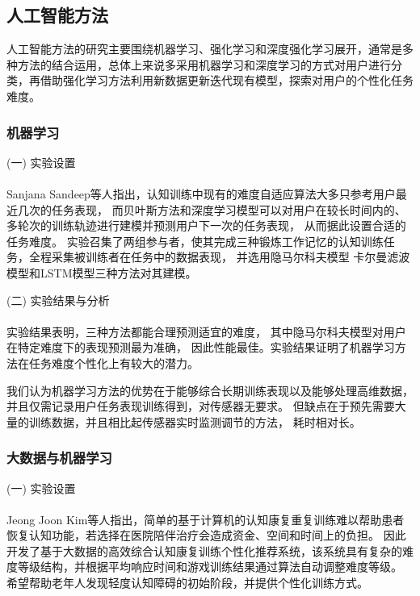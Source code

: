 \documentclass{article}
\begin{document}
            
        \subsection{人工智能方法}
        人工智能方法的研究主要围绕机器学习、强化学习和深度强化学习展开，通常是多种方法的结合运用，总体上来说多采用机器学习和深度学习的方式对用户进行分类，再借助强化学习方法利用新数据更新迭代现有模型，探索对用户的个性化任务难度。
            \subsubsection{机器学习}
            (一) 实验设置\paragraph{}
            Sanjana Sandeep等人指出，认知训练中现有的难度自适应算法大多只参考用户最近几次的任务表现，
            而贝叶斯方法和深度学习模型可以对用户在较长时间内的、多轮次的训练轨迹进行建模并预测用户下一次的任务表现，
            从而据此设置合适的任务难度。
            实验召集了两组参与者，使其完成三种锻炼工作记忆的认知训练任务，全程采集被训练者在任务中的数据表现，
            并选用隐马尔科夫模型 卡尔曼滤波模型和LSTM模型三种方法对其建模。

            (二) 实验结果与分析\paragraph{}
            实验结果表明，三种方法都能合理预测适宜的难度，
            其中隐马尔科夫模型对用户在特定难度下的表现预测最为准确，
            因此性能最佳。实验结果证明了机器学习方法在任务难度个性化上有较大的潜力。

            我们认为机器学习方法的优势在于能够综合长期训练表现以及能够处理高维数据，
            并且仅需记录用户任务表现训练得到，对传感器无要求。
            但缺点在于预先需要大量的训练数据，并且相比起传感器实时监测调节的方法，
            耗时相对长。

            \subsubsection{大数据与机器学习}
            (一) 实验设置\paragraph{}
            Jeong Joon Kim\cite{ref10}等人指出，简单的基于计算机的认知康复重复训练难以帮助患者恢复认知功能，若选择在医院陪伴治疗会造成资金、空间和时间上的负担。
            因此开发了基于大数据的高效综合认知康复训练个性化推荐系统，该系统具有复杂的难度等级结构，并根据平均响应时间和游戏训练结果通过算法自动调整难度等级。
            希望帮助老年人发现轻度认知障碍的初始阶段，并提供个性化训练方式。
\end{document}
